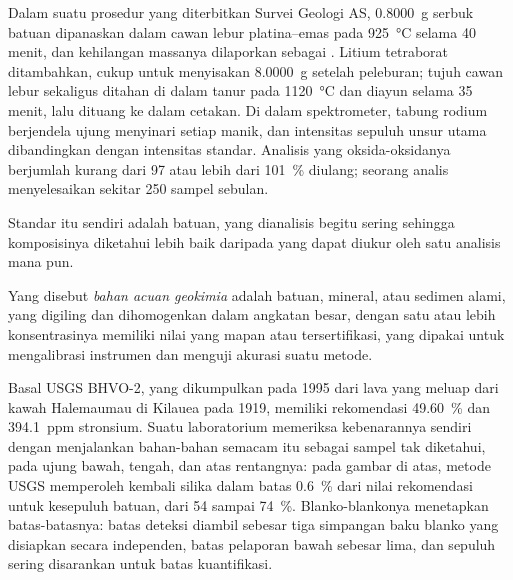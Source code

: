 \begin{inthelab}
Dalam suatu prosedur yang diterbitkan Survei Geologi AS, \qty{0.8000}{g} serbuk batuan dipanaskan dalam
cawan lebur platina--emas pada \qty{925}{\celsius} selama 40 menit, dan kehilangan massanya dilaporkan sebagai
. Litium tetraborat ditambahkan, cukup untuk menyisakan \qty{8.0000}{g} setelah peleburan;
tujuh cawan lebur sekaligus ditahan di dalam tanur pada \qty{1120}{\celsius} dan diayun selama 35 menit,
lalu dituang ke dalam cetakan. Di dalam spektrometer, tabung rodium berjendela ujung menyinari setiap manik, dan
intensitas sepuluh unsur utama dibandingkan dengan intensitas standar. Analisis yang
oksida-oksidanya berjumlah kurang dari 97 atau lebih dari \qty{101}{\percent} diulang; seorang analis menyelesaikan
sekitar 250 sampel sebulan.
\end{inthelab}

Standar itu sendiri adalah batuan, yang dianalisis begitu sering sehingga komposisinya diketahui lebih baik daripada
yang dapat diukur oleh satu analisis mana pun.

\begin{definition}\label{def:b2:field-lab-methods-2:rm}
Yang disebut \emph{bahan acuan geokimia} adalah batuan,
mineral, atau sedimen alami, yang digiling dan dihomogenkan dalam angkatan besar, dengan satu atau lebih konsentrasinya
memiliki nilai yang mapan atau tersertifikasi, yang dipakai untuk mengalibrasi instrumen dan menguji akurasi
suatu metode.
\end{definition}

Basal USGS BHVO-2, yang dikumpulkan pada 1995 dari lava yang meluap dari kawah Halemaumau di
Kilauea pada 1919, memiliki  rekomendasi \qty{49.60}{\percent} dan \qty{394.1}{ppm}
stronsium. Suatu laboratorium memeriksa kebenarannya sendiri dengan menjalankan bahan-bahan semacam itu sebagai sampel tak diketahui, pada ujung bawah,
tengah, dan atas rentangnya: pada gambar di atas, metode USGS memperoleh kembali silika dalam batas
\qty{0.6}{\percent} dari nilai rekomendasi untuk kesepuluh batuan, dari  54 sampai
\qty{74}{\percent}. Blanko-blankonya menetapkan batas-batasnya: batas deteksi diambil sebesar tiga simpangan
baku blanko yang disiapkan secara independen, batas pelaporan bawah sebesar lima, dan sepuluh sering
disarankan untuk batas kuantifikasi.

